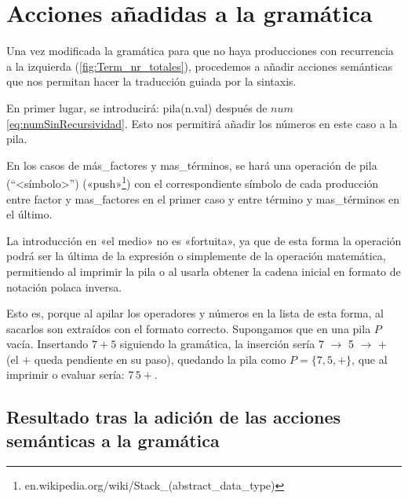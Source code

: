 \documentclass[a4paper,twocolumn]{article}
\begin{document}
    \section{Acciones añadidas a la gramática}\label{sec:acciones-anadidas-a-la-gramatica}
    Una vez modificada la gramática para que no haya producciones con recurrencia a la izquierda (\autoref{fig:Term_nr_totales}), procedemos a añadir acciones semánticas que nos permitan hacer la traducción guiada por la sintaxis.


    En primer lugar, se introducirá: pila(n.val) después de $num$\eqref{eq:numSinRecursividad}.
    Esto nos permitirá añadir los números en este caso a la pila.

    En los casos de más\_factores y mas\_términos, se hará una operación de pila (``<símbolo>'') («push»\footnote{en.wikipedia.org/wiki/Stack\_(abstract\_data\_type)}) con el correspondiente símbolo de cada producción entre factor y mas\_factores en el primer caso y entre término y mas\_términos en el último.

    La introducción en «el medio» no es «fortuita», ya que de esta forma la operación podrá ser la última de la expresión o simplemente de la operación matemática, permitiendo al imprimir la pila o al usarla obtener la cadena inicial en formato de notación polaca inversa.

    Esto es, porque al apilar los operadores y números en la lista de esta forma, al sacarlos son extraídos con el formato correcto.
    Supongamos que en una pila $P$ vacía.
    Insertando $7+5$ siguiendo la gramática, la inserción sería 7 $\rightarrow$ 5 $\rightarrow$ $+$ (el $+$ queda pendiente en su paso), quedando la pila como $P=\{7,5,+\}$, que al imprimir o evaluar sería: $7\,5 +.$

    \subsection{Resultado tras la adición de las acciones semánticas a la gramática}\label{subsec:resultado-tras-la-adicion-de-las-acciones-semanticas-a-la-gramatica}
\end{document}
